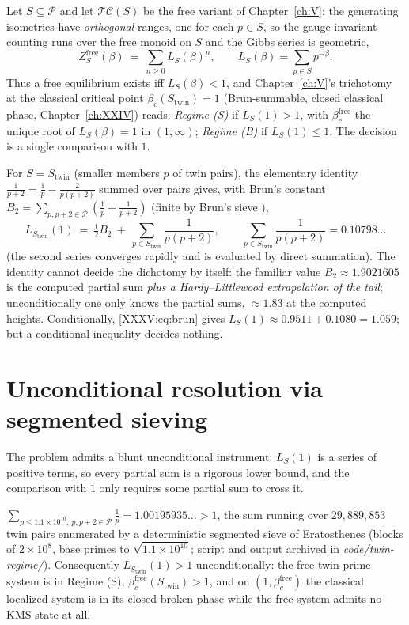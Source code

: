 Let $S\subseteq\mathcal{P}$ and let $\mathcal T\mathcal C(S)$ be the free variant of Chapter~\ref{ch:V}: the
generating isometries have \emph{orthogonal} ranges, one for each $p\in S$, so the
gauge-invariant counting runs over the free monoid on $S$ and the Gibbs series is
geometric,
\[
Z^{\mathrm{free}}_S(\beta)\ =\ \sum_{n\ge0}L_S(\beta)^n,\qquad
L_S(\beta)=\sum_{p\in S}p^{-\beta}.
\]
Thus a free equilibrium exists iff $L_S(\beta)<1$, and Chapter~\ref{ch:V}'s trichotomy at the
classical critical point $\beta_c(S_{\mathrm{twin}})=1$ (Brun-summable, closed classical
phase, Chapter~\ref{ch:XXIV}) reads: \emph{Regime (S)} if $L_S(1)>1$, with
$\beta_c^{\mathrm{free}}$ the unique root of $L_S(\beta)=1$ in $(1,\infty)$;
\emph{Regime (B)} if $L_S(1)\le1$. The decision is a single comparison with $1$.

For $S=S_{\mathrm{twin}}$ (smaller members $p$ of twin pairs), the elementary identity
$\frac1{p+2}=\frac1p-\frac2{p(p+2)}$ summed over pairs gives, with Brun's constant
$B_2=\sum_{p,p+2\in\mathcal{P}}(\frac1p+\frac1{p+2})$ (finite by Brun's sieve \cite{HR}),
\begin{equation}\label{XXXV:eq:brun}
L_{S_{\mathrm{twin}}}(1)\ =\ \tfrac12B_2\ +\ \sum_{p\in S_{\mathrm{twin}}}\frac1{p(p+2)},
\qquad
\sum_{p\in S_{\mathrm{twin}}}\frac1{p(p+2)}=0.10798\ldots
\end{equation}
(the second series converges rapidly and is evaluated by direct summation). The identity
cannot decide the dichotomy by itself: the familiar value $B_2\approx1.9021605$
\cite{Nicely} is the computed partial sum \emph{plus a Hardy--Littlewood extrapolation of
the tail}; unconditionally one only knows the partial sums, $\approx1.83$ at the computed
heights. Conditionally, \eqref{XXXV:eq:brun} gives $L_S(1)\approx0.9511+0.1080=1.059$; but a
conditional inequality decides nothing.

\section{Unconditional resolution via segmented sieving}\label{XXXV:sec:sieve}

The problem admits a blunt unconditional instrument: $L_S(1)$ is a series of positive
terms, so every partial sum is a rigorous lower bound, and the comparison with $1$ only
requires some partial sum to cross it.

\begin{theorem}\label{XXXV:thm:main}
$\displaystyle\sum_{p\le1.1\times10^{10},\ p,p+2\in\mathcal{P}}\frac1p=1.00195935\ldots>1$, the sum
running over $29{,}889{,}853$ twin pairs enumerated by a deterministic segmented sieve of
Eratosthenes (blocks of $2\times10^8$, base primes to $\sqrt{1.1\times10^{10}}$; script
and output archived in \emph{code/twin-regime/}). Consequently
$L_{S_{\mathrm{twin}}}(1)>1$ unconditionally: the free twin-prime system is in Regime
(S), $\beta_c^{\mathrm{free}}(S_{\mathrm{twin}})>1$, and on
$(1,\beta_c^{\mathrm{free}})$ the classical localized system is in its closed broken
phase while the free system admits no KMS state at all.
\end{theorem}

